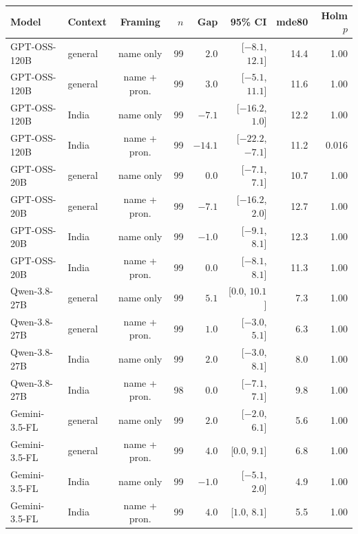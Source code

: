\begin{tabular}{@{}llcrrrrr@{}}
\toprule
Model & Context & Framing & $n$ & Gap & 95\% CI & mde80 & Holm $p$ \\
\midrule
GPT-OSS-120B & general & name only & 99 & $2.0$ & [$-8.1$, $12.1$] & 14.4 & 1.00 \\
GPT-OSS-120B & general & name + pron. & 99 & $3.0$ & [$-5.1$, $11.1$] & 11.6 & 1.00 \\
GPT-OSS-120B & India & name only & 99 & $-7.1$ & [$-16.2$, $1.0$] & 12.2 & 1.00 \\
GPT-OSS-120B & India & name + pron. & 99 & \textbf{$-14.1$} & [$-22.2$, $-7.1$] & 11.2 & 0.016 \\
\addlinespace[1pt]
GPT-OSS-20B & general & name only & 99 & $0.0$ & [$-7.1$, $7.1$] & 10.7 & 1.00 \\
GPT-OSS-20B & general & name + pron. & 99 & $-7.1$ & [$-16.2$, $2.0$] & 12.7 & 1.00 \\
GPT-OSS-20B & India & name only & 99 & $-1.0$ & [$-9.1$, $8.1$] & 12.3 & 1.00 \\
GPT-OSS-20B & India & name + pron. & 99 & $0.0$ & [$-8.1$, $8.1$] & 11.3 & 1.00 \\
\addlinespace[1pt]
Qwen-3.8-27B & general & name only & 99 & $5.1$ & [$0.0$, $10.1$] & 7.3 & 1.00 \\
Qwen-3.8-27B & general & name + pron. & 99 & $1.0$ & [$-3.0$, $5.1$] & 6.3 & 1.00 \\
Qwen-3.8-27B & India & name only & 99 & $2.0$ & [$-3.0$, $8.1$] & 8.0 & 1.00 \\
Qwen-3.8-27B & India & name + pron. & 98 & $0.0$ & [$-7.1$, $7.1$] & 9.8 & 1.00 \\
\addlinespace[1pt]
Gemini-3.5-FL & general & name only & 99 & $2.0$ & [$-2.0$, $6.1$] & 5.6 & 1.00 \\
Gemini-3.5-FL & general & name + pron. & 99 & $4.0$ & [$0.0$, $9.1$] & 6.8 & 1.00 \\
Gemini-3.5-FL & India & name only & 99 & $-1.0$ & [$-5.1$, $2.0$] & 4.9 & 1.00 \\
Gemini-3.5-FL & India & name + pron. & 99 & $4.0$ & [$1.0$, $8.1$] & 5.5 & 1.00 \\
\bottomrule
\end{tabular}
